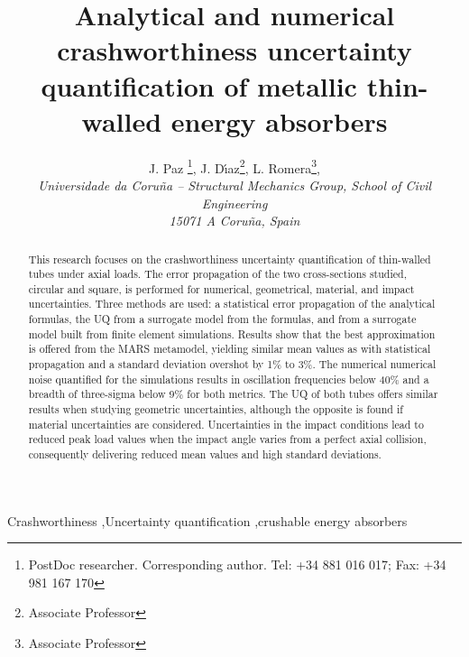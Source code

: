 \documentclass[12pt,number,preprint,review,times]{elsarticle}
\begin{document}

\begin{frontmatter}
\title{Analytical and numerical crashworthiness uncertainty quantification of metallic thin-walled  energy absorbers}




\author{
J. Paz \footnote{PostDoc researcher. Corresponding author. Tel: +34 881 016 017; Fax: +34 981 167 170},
J. D\'{\i}az\footnote{Associate Professor},
L. Romera\footnote{Associate Professor}, \\
{\normalsize\itshape
Universidade da Coru\~{n}a -- Structural Mechanics Group, School of Civil Engineering} \\ 
{\normalsize\itshape 15071 A Coru\~{n}a, Spain }}

\begin{abstract}

This research focuses on the crashworthiness uncertainty quantification of thin-walled tubes under axial loads. The error propagation of the two cross-sections studied, circular and square, is performed for numerical, geometrical, material, and impact uncertainties. Three methods are used: a statistical error propagation of the analytical formulas, the UQ from a surrogate model from the formulas, and from a surrogate model built from finite element simulations. Results show that the best approximation is offered from the MARS metamodel, yielding similar mean values as with statistical propagation and a standard deviation overshot by 1\% to 3\%. The numerical numerical noise quantified for the simulations results in oscillation frequencies below 40\% and a breadth of three-sigma below 9\% for both metrics. The UQ of both tubes offers similar results when studying geometric uncertainties, although the opposite is found if material uncertainties are considered. Uncertainties in the impact conditions lead to reduced peak load values when the impact angle varies from a perfect axial collision, consequently delivering reduced  mean  values  and  high  standard deviations.
 
 
\end{abstract}

\begin{keyword}
Crashworthiness \sep Uncertainty quantification \sep crushable energy absorbers
\end{keyword}


\end{frontmatter}
\end{document}
